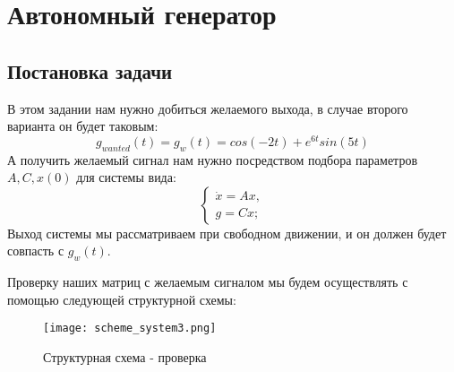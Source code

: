\chapter{Автономный генератор}
\label{ch:chap3}
\section{Постановка задачи}
В этом задании нам нужно добиться желаемого выхода, в случае второго варианта он будет таковым:
$$
g_{wanted}(t) = g_w(t) = cos(-2t) + e^{6t}sin(5t)
$$
А получить желаемый сигнал нам нужно посредством подбора параметров $A, C, x(0)$ для системы вида:
$$
\begin{cases}
    \dot{x} = Ax, \\
    g = Cx;
\end{cases}
$$
Выход системы мы рассматриваем при свободном движении, и он должен будет совпасть с $g_w(t)$.

Проверку наших матриц с желаемым сигналом мы будем осуществлять с помощью следующей структурной схемы:
\begin{figure}[ht]
    \centering
    \texttt{[image: scheme\_system3.png]}
	\caption{Структурная схема - проверка}
\end{figure}


\newpage
